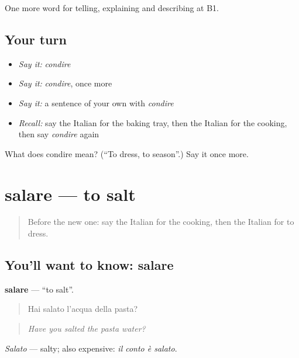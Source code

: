 \begin{grammarlens}[title={What you've built}]
One more word for telling, explaining and describing at B1.
\end{grammarlens}

\subsection*{Your turn}
\begin{itemize}
\raggedright
  \item \emph{Say it:} \emph{condire}
  \item \emph{Say it:} \emph{condire}, once more
  \item \emph{Say it:} a sentence of your own with \emph{condire}
  \item \emph{Recall:} say the Italian for the baking tray, then the Italian for the cooking, then say \emph{condire} again
\end{itemize}

\begin{tcolorbox}[breakable,colback=teal!4,colframe=teal!35!black,title={Before you move on}]
What does condire mean? (\textquotedblleft{}To dress, to season\textquotedblright{}.) Say it once more.
\end{tcolorbox}
\section[salare]{salare — to salt}

\label{lesson:IT-C337-salare}



\begin{quote}
Before the new one: say the Italian for the cooking, then the Italian for to dress.
\end{quote}

\subsection*{You'll want to know: salare}
\textbf{salare} — \textquotedblleft{}to salt\textquotedblright{}.

\begin{quote}
Hai salato l'acqua della pasta?
\end{quote}

\begin{quote}
\emph{Have you salted the pasta water?}
\end{quote}

\emph{Salato} — salty; also expensive: \emph{il conto è salato}.

